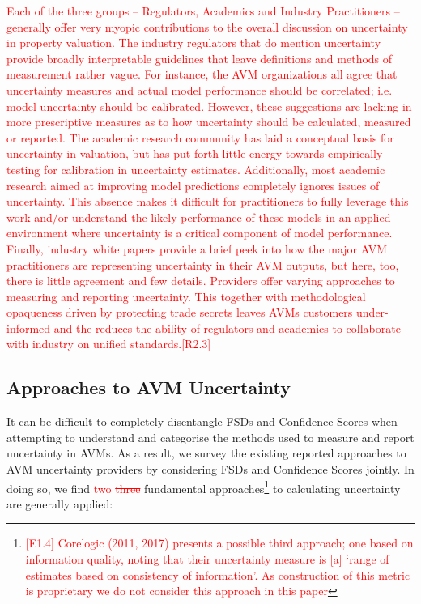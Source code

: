 \documentclass[colTwo]{anon}
\theoremstyle{definition}
\begin{document}
\textcolor{red}{Each of the three groups -- Regulators, Academics and Industry Practitioners -- generally offer very myopic contributions to the overall discussion on uncertainty in property valuation. The industry regulators that do mention uncertainty provide broadly interpretable guidelines that leave definitions and methods of measurement rather vague.  For instance, the AVM organizations all agree that uncertainty measures and actual model performance should be correlated; i.e. model uncertainty should be calibrated.  However, these suggestions are lacking in more prescriptive measures as to how uncertainty should be calculated, measured or reported.  The academic research community has laid a conceptual basis for uncertainty in valuation, but has put forth little energy towards empirically testing for calibration in uncertainty estimates. Additionally, most academic research aimed at improving model predictions completely ignores issues of uncertainty.  This absence makes it difficult for practitioners to fully leverage this work and/or understand the likely performance of these models in an applied environment where uncertainty is a critical component of model performance.  Finally, industry white papers provide a brief peek into how the major AVM practitioners are representing uncertainty in their AVM outputs, but here, too, there is little agreement and few details. Providers offer varying approaches to measuring and reporting uncertainty. This together with methodological opaqueness driven by protecting trade secrets leaves AVMs customers under-informed and the reduces the ability of regulators and academics to collaborate with industry on unified standards.[R2.3]}

\subsection{Approaches to AVM Uncertainty}

It can be difficult to completely disentangle FSDs and Confidence Scores when attempting to understand and categorise the methods used to measure and report uncertainty in AVMs.  As a result, we survey the existing reported approaches to AVM uncertainty providers by considering FSDs and Confidence Scores jointly.  In doing so, we find \textcolor{red}{two \st{three}} fundamental approaches\footnote{\textcolor{red}{[E1.4] Corelogic (2011, 2017) presents a possible third approach; one based on information quality, noting that their uncertainty measure is [a] ‘range of estimates based on consistency of information’. As construction of this metric is proprietary we do not consider this approach in this paper}} to calculating uncertainty are generally applied: 
\end{document}

